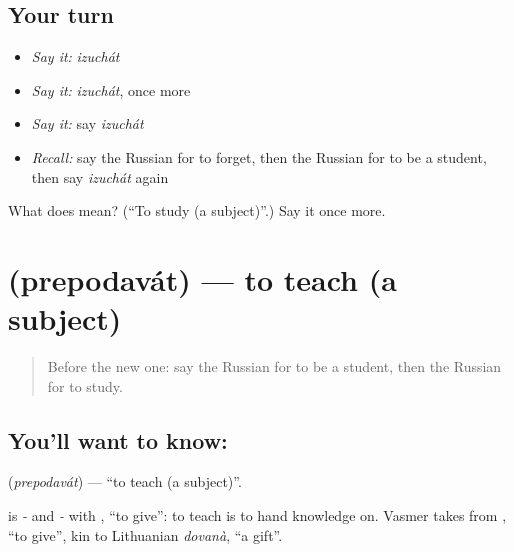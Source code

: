 \subsection*{Your turn}
\begin{itemize}
\raggedright
  \item \emph{Say it:} \emph{izuchát}
  \item \emph{Say it:} \emph{izuchát}, once more
  \item \emph{Say it:} say \emph{izuchát}
  \item \emph{Recall:} say the Russian for to forget, then the Russian for to be a student, then say \emph{izuchát} again
\end{itemize}

\begin{tcolorbox}[breakable,colback=teal!4,colframe=teal!35!black,title={Before you move on}]
What does  mean? (\textquotedblleft{}To study (a subject)\textquotedblright{}.) Say it once more.
\end{tcolorbox}
\section[\texorpdfstring{\ru{преподавать} (prepodavát)}{преподавать (prepodavát)}]{ (prepodavát) — to teach (a subject)}

\label{lesson:RU-C205-prepodavat}



\begin{quote}
Before the new one: say the Russian for to be a student, then the Russian for to study.
\end{quote}

\subsection*{You'll want to know: }
\textbf{} (\emph{prepodavát}) — \textquotedblleft{}to teach (a subject)\textquotedblright{}.

\begin{cousinweb}
\textbf{} is \emph{-} and \emph{-} with \emph{}, \textquotedblleft{}to give\textquotedblright{}: to teach is to hand knowledge on. Vasmer takes \emph{} from \emph{}, \textquotedblleft{}to give\textquotedblright{}, kin to Lithuanian \emph{dovanà}, \textquotedblleft{}a gift\textquotedblright{}.
\end{cousinweb}

